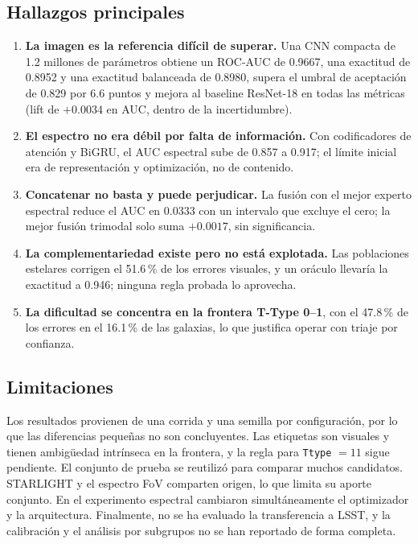 \documentclass[letterpaper,11pt]{article}
\begin{document}
\subsection{Hallazgos principales}
\begin{enumerate}
  \item \textbf{La imagen es la referencia difícil de superar.} Una CNN compacta de 1.2 millones de parámetros obtiene un ROC-AUC de 0.9667, una exactitud de 0.8952 y una exactitud balanceada de 0.8980, supera el umbral de aceptación de 0.829 por 6.6 puntos y mejora al baseline ResNet-18 en todas las métricas (lift de $+0.0034$ en AUC, dentro de la incertidumbre).
  \item \textbf{El espectro no era débil por falta de información.} Con codificadores de atención y BiGRU, el AUC espectral sube de 0.857 a 0.917; el límite inicial era de representación y optimización, no de contenido.
  \item \textbf{Concatenar no basta y puede perjudicar.} La fusión con el mejor experto espectral reduce el AUC en 0.0333 con un intervalo que excluye el cero; la mejor fusión trimodal solo suma $+0.0017$, sin significancia.
  \item \textbf{La complementariedad existe pero no está explotada.} Las poblaciones estelares corrigen el 51.6\,\% de los errores visuales, y un oráculo llevaría la exactitud a 0.946; ninguna regla probada lo aprovecha.
  \item \textbf{La dificultad se concentra en la frontera T-Type 0--1}, con el 47.8\,\% de los errores en el 16.1\,\% de las galaxias, lo que justifica operar con triaje por confianza.
\end{enumerate}

\subsection{Limitaciones}
Los resultados provienen de una corrida y una semilla por configuración, por lo que las diferencias pequeñas no son concluyentes. Las etiquetas son visuales y tienen ambigüedad intrínseca en la frontera, y la regla para \texttt{Ttype} $= 11$ sigue pendiente. El conjunto de prueba se reutilizó para comparar muchos candidatos. STARLIGHT y el espectro FoV comparten origen, lo que limita su aporte conjunto. En el experimento espectral cambiaron simultáneamente el optimizador y la arquitectura. Finalmente, no se ha evaluado la transferencia a LSST, y la calibración y el análisis por subgrupos no se han reportado de forma completa.
\end{document}
